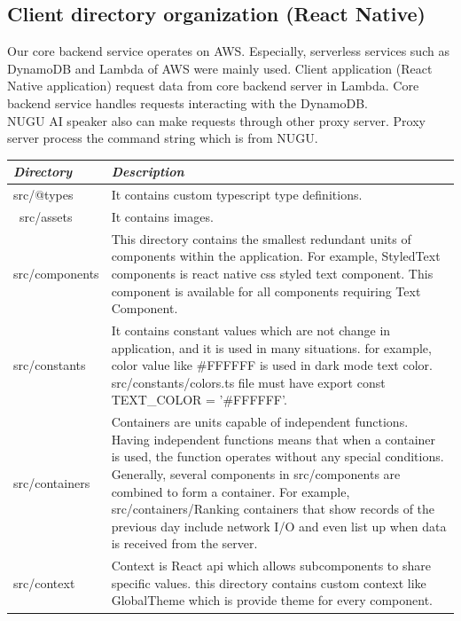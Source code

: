 \documentclass[conference]{IEEEtran}
\begin{document}
\subsection{Client directory organization (React Native)} 

Our core backend service operates on AWS. Especially, serverless services such as DynamoDB and Lambda of AWS were mainly used. Client application (React Native application) request data from core backend server in Lambda. Core backend service handles requests interacting with the DynamoDB. \\
NUGU AI speaker also can make requests through other proxy server. Proxy server process the command
string which is from NUGU.

\begin{enumerate}
    \begin{table}[h]
\begin{center}
\begin{tabular}{ | m{2cm} | m{6cm} | }
\hline
\textbf{\textit{Directory}}& \textbf{\textit{Description}} \\
\hline
src/@types & It contains custom typescript type definitions. \\
\hline\
src/assets & It contains images. \\
\hline
src/components & This directory contains the smallest redundant units of components within the application. For example, StyledText components is react native css styled text component. This component is available for all components requiring Text Component. \\
\hline
src/constants & It contains constant values which are not change in application, and it is used in many situations. for example, color value like #FFFFFF is used in dark mode text color. src/constants/colors.ts file must have export const TEXT\_COLOR = '#FFFFFF'. \\
\hline
src/containers & Containers are units capable of independent functions. Having independent functions means that when a container is used, the function operates without any special conditions. Generally, several components in src/components are combined to form a container. For example, src/containers/Ranking containers that show records of the previous day include network I/O and even list up when data is received from the server. \\
\hline
src/context & Context is React api which allows subcomponents to share specific values. this directory contains custom context like GlobalTheme which is provide theme for every component. \\

\end{tabular}
\end{center}
\end{table}
\end{enumerate}
\end{document}
